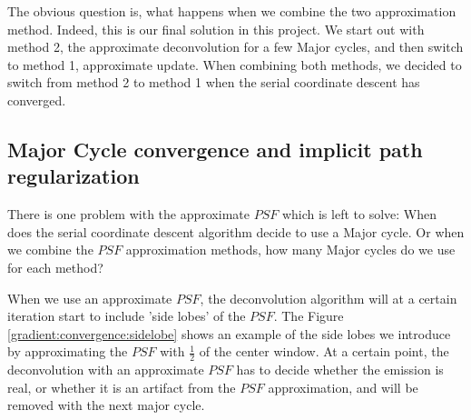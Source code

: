 The obvious question is, what happens when we combine the two approximation method. Indeed, this is our final solution in this project. We start out with method 2, the approximate deconvolution for a few Major cycles, and then switch to method 1, approximate update. When combining both methods, we decided to switch from method 2 to method 1 when the serial coordinate descent has converged.


\subsection{Major Cycle convergence and implicit path regularization}\label{gradients:pathreg}
There is one problem with the approximate $PSF$ which is left to solve: When does the serial coordinate descent algorithm decide to use a Major cycle. Or when we combine the $PSF$ approximation methods, how many Major cycles do we use for each method?

When we use an approximate $PSF$, the deconvolution algorithm will at a certain iteration start to include 'side lobes' of the $PSF$. The Figure \ref{gradient:convergence:sidelobe} shows an example of the side lobes we introduce by approximating the $PSF$ with $\frac{1}{2}$ of the center window. At a certain point, the deconvolution with an approximate $PSF$ has to decide whether the emission is real, or whether it is an artifact from the $PSF$ approximation, and will be removed with the next major cycle.


